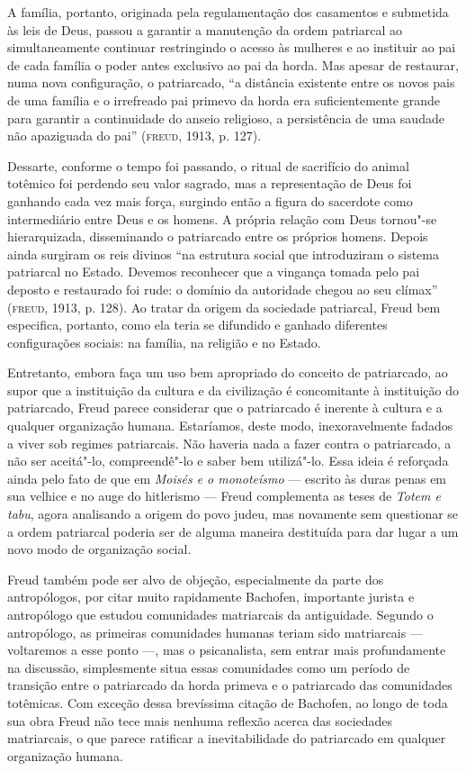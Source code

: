 A família, portanto, originada pela regulamentação dos casamentos e
submetida às leis de Deus, passou a garantir a manutenção da ordem
patriarcal ao simultaneamente continuar restringindo o acesso às
mulheres e ao instituir ao pai de cada família o poder antes exclusivo
ao pai da horda. Mas apesar de restaurar, numa nova configuração, o
patriarcado, ``a distância existente entre os novos pais de uma família
e o irrefreado pai primevo da horda era suficientemente grande para
garantir a continuidade do anseio religioso, a persistência de uma
saudade não apaziguada do pai'' (\textsc{freud}, 1913, p. 127).

Dessarte, conforme o tempo foi passando, o ritual de sacrifício do
animal totêmico foi perdendo seu valor sagrado, mas a representação de
Deus foi ganhando cada vez mais força, surgindo então a figura do
sacerdote como intermediário entre Deus e os homens. A própria relação
com Deus tornou"-se hierarquizada, disseminando o patriarcado entre os
próprios homens. Depois ainda surgiram os reis divinos ``na estrutura
social que introduziram o sistema patriarcal no Estado. Devemos
reconhecer que a vingança tomada pelo pai deposto e restaurado foi rude:
o domínio da autoridade chegou ao seu clímax'' (\textsc{freud}, 1913, p. 128).
Ao tratar da origem da sociedade patriarcal, Freud bem especifica,
portanto, como ela teria se difundido e ganhado diferentes configurações
sociais: na família, na religião e no Estado.

Entretanto, embora faça um uso bem apropriado do conceito de
patriarcado, ao supor que a instituição da cultura e da civilização é
concomitante à instituição do patriarcado, Freud parece considerar que o
patriarcado é inerente à cultura e a qualquer organização humana.
Estaríamos, deste modo, inexoravelmente fadados a viver sob regimes
patriarcais. Não haveria nada a fazer contra o patriarcado, a não ser
aceitá"-lo, compreendê"-lo e saber bem utilizá"-lo. Essa ideia é reforçada
ainda pelo fato de que em \emph{Moisés e o monoteísmo} --- escrito às
duras penas em sua velhice e no auge do hitlerismo --- Freud complementa
as teses de \emph{Totem e tabu}, agora analisando a origem do povo
judeu, mas novamente sem questionar se a ordem patriarcal poderia ser de
alguma maneira destituída para dar lugar a um novo modo de organização
social.

Freud também pode ser alvo de objeção, especialmente da parte dos
antropólogos, por citar muito rapidamente Bachofen, importante jurista e
antropólogo que estudou comunidades matriarcais da antiguidade. Segundo
o antropólogo, as primeiras comunidades humanas teriam sido matriarcais
--- voltaremos a esse ponto ---, mas o psicanalista, sem entrar mais
profundamente na discussão, simplesmente situa essas comunidades como um
período de transição entre o patriarcado da horda primeva e o
patriarcado das comunidades totêmicas. Com exceção dessa brevíssima
citação de Bachofen, ao longo de toda sua obra Freud não tece mais
nenhuma reflexão acerca das sociedades matriarcais, o que parece
ratificar a inevitabilidade do patriarcado em qualquer organização
humana.

